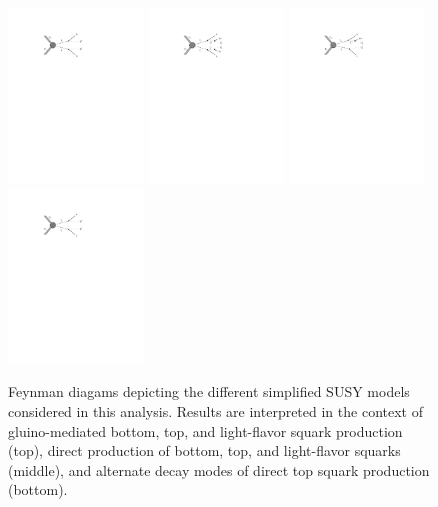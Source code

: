 \begin{figure}
	\includegraphics[width=0.32\textwidth]{results/figs/T2qq}
	\includegraphics[width=0.32\textwidth]{results/figs/T2bw}
	\includegraphics[width=0.32\textwidth]{results/figs/T2tb}
	\includegraphics[width=0.32\textwidth]{results/figs/T2cc}
	\renewcommand{\baselinestretch}{1.0}
	\caption[Feynman diagams depicting the different simplified SUSY models considered in this analysis.]{Feynman diagams depicting the different simplified SUSY models considered in this analysis. Results are interpreted in the context of gluino-mediated bottom, top, and light-flavor squark production (top), direct production of bottom, top, and light-flavor squarks (middle), and alternate decay modes of direct top squark production (bottom).}
	\label{fig:signalFeynman}
\end{figure}

